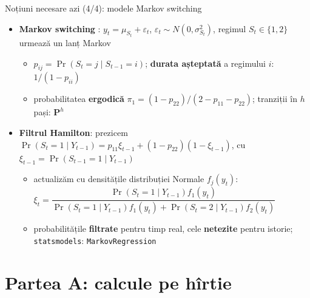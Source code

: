 \begin{frame}{Noțiuni necesare azi (4/4): modele Markov switching}
\itemsize{\small}
\begin{itemize}
    \item \textbf{Markov switching} : $y_t = \mu_{S_t} + \varepsilon_t$, $\varepsilon_t \sim N(0, \sigma^2_{S_t})$, regimul $S_t \in \{1, 2\}$ urmează un lanț Markov
    \begin{itemize}
        \item $p_{ij} = \Pr(S_t = j \mid S_{t-1} = i)$; \textbf{durata așteptată} a regimului $i$: $1/(1 - p_{ii})$
        \item probabilitatea \textbf{ergodică} $\pi_1 = (1 - p_{22})/(2 - p_{11} - p_{22})$; tranziții în $h$ pași: $\mathbf{P}^h$
    \end{itemize}
    \item \textbf{Filtrul Hamilton}: prezicem $\Pr(S_t = 1 \mid Y_{t-1}) = p_{11}\xi_{t-1} + (1 - p_{22})(1 - \xi_{t-1})$, cu $\xi_{t-1} = \Pr(S_{t-1} = 1 \mid Y_{t-1})$
    \begin{itemize}
        \item actualizăm cu densitățile distribuției Normale $f_j(y_t)$: $\xi_t = \dfrac{\Pr(S_t = 1 \mid Y_{t-1})f_1(y_t)}{\Pr(S_t = 1 \mid Y_{t-1})f_1(y_t) + \Pr(S_t = 2 \mid Y_{t-1})f_2(y_t)}$
        \item probabilitățile \textbf{filtrate} pentru timp real, cele \textbf{netezite} pentru istorie; \texttt{statsmodels}: \texttt{MarkovRegression}
    \end{itemize}
\end{itemize}
\end{frame}


\section{Partea A: calcule pe hîrtie}

